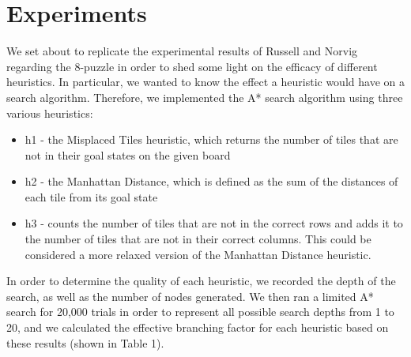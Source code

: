 
\section{Experiments}
\label{sec:expts}


We set about to replicate the experimental results of Russell and
Norvig regarding the 8-puzzle in order to shed some light on the
efficacy of different heuristics. In particular, we wanted to know the
effect a heuristic would have on a search algorithm. Therefore, we
implemented the A* search algorithm using three various heuristics:

\begin{itemize}
  \item h1 - the Misplaced Tiles heuristic, which returns the number
    of tiles that are not in their goal states on the given board
  \item h2 - the Manhattan Distance, which is defined as the sum of
    the distances of each tile from its goal state
  \item h3 - counts the number of tiles that are not in the correct
    rows and adds it to the number of tiles that are not in their
    correct columns. This could be considered a more relaxed version
    of the Manhattan Distance heuristic. 
\end{itemize}

In order to determine the quality of each heuristic, we recorded the
depth of the search, as well as the number of nodes generated. We then
ran a limited A* search for 20,000 trials in order to represent all
possible search depths from 1 to 20, and we calculated the effective
branching factor for each heuristic based on these results (shown in
Table 1).  






